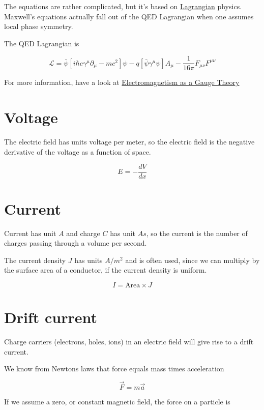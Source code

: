 The equations are rather complicated, but it's based on
\href{https://en.wikipedia.org/wiki/Lagrangian_(field_theory)}{Lagrangian}
physics. Maxwell's equations actually fall out of the QED Lagrangian
when one assumes local phase symmetry.

The QED Lagrangian is

\[ \mathcal{L} = \bar{\psi}[i \hbar c \gamma^\mu\partial_\mu - mc^2]\psi - q[\bar{\psi} \gamma^\mu \psi] A_\mu - \frac{1}{16 \pi}F_{\mu\nu}F^{\mu\nu} \]

For more information, have a look at
\href{https://www.youtube.com/watch?v=Sj_GSBaUE1o}{Electromagnetism as a
Gauge Theory}

\section{Voltage}\label{voltage}

The electric field has units voltage per meter, so the electric field is
the negative derivative of the voltage as a function of space.

\[ E = -\frac{dV}{dx}\]

\section{Current}\label{current}

Current has unit \(A\) and charge \(C\) has unit \(As\), so the current
is the number of charges passing through a volume per second.

The current density \(J\) has units \(A/m^2\) and is often used, since
we can multiply by the surface area of a conductor, if the current
density is uniform.

\[ I  = \text{Area} \times J \]

\section{Drift current}\label{drift-current}

Charge carriers (electrons, holes, ions) in an electric field will give
rise to a drift current.

We know from Newtons laws that force equals mass times acceleration

\[ \vec{F} = m \vec{a}\]

If we assume a zero, or constant magnetic field, the force on a particle
is

